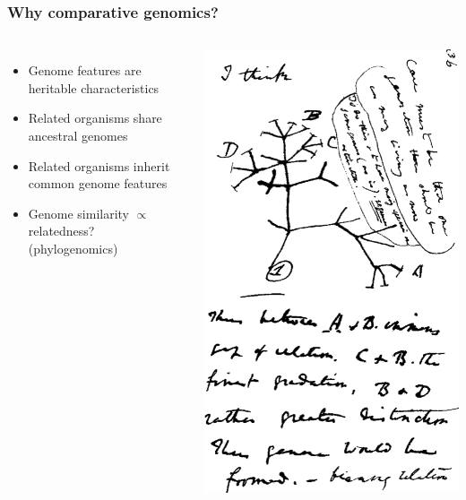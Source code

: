 %
\begin{frame}
  \frametitle{Why comparative genomics?}
    \begin{columns}[c] 
        \begin{itemize}
         \item \textcolor{hutton_green}{Genome features are heritable characteristics}
         \item \textcolor{hutton_purple}{Related organisms share ancestral genomes}
         \item \textcolor{hutton_blue}{Related organisms inherit common genome features}
         \item \textcolor{RawSienna}{Genome similarity $\propto$ relatedness? (phylogenomics)}
        \end{itemize}
        \includegraphics[width=\textwidth]{images/darwin_tree}
    \end{columns}  
\end{frame}

